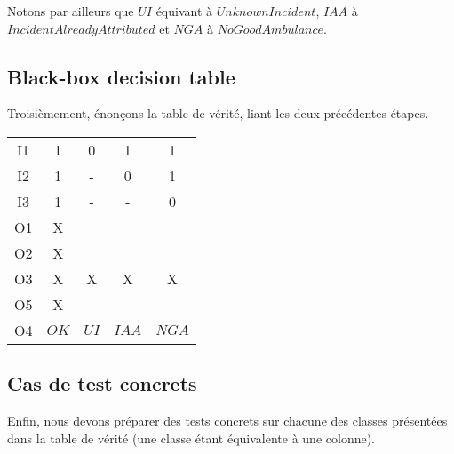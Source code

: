 \documentclass{report}
\begin{document}
Notons par ailleurs que $UI$ équivant à $UnknownIncident$, $IAA$ à $IncidentAlreadyAttributed$ et $NGA$ à $NoGoodAmbulance$.

\subsection{Black-box decision table}

Troisièmement, énonçons la table de vérité, liant les deux précédentes
étapes.

\begin{tabular}{|c|c|c|c|c|}
	\hline
	I1 & 1 & 0 & 1 & 1 \\
	I2 & 1 & - & 0 & 1 \\
	I3 & 1 & - & - & 0 \\
	\hline \hline
	O1 & X &   &   &   \\
	O2 & X &   &   &   \\
	O3 & X & X & X & X \\
	O5 & X &   &   &   \\
	O4 & $OK$ & $UI$ & $IAA$ & $NGA$ \\
	\hline
\end{tabular}

\subsection{Cas de test concrets}

Enfin, nous devons préparer des tests concrets sur chacune des classes 
présentées dans la table de vérité (une classe étant équivalente à une
colonne).
\end{document}
